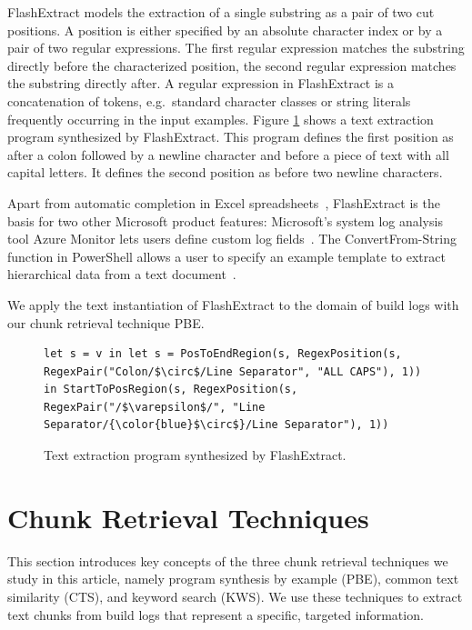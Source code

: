 FlashExtract models the extraction of a single substring as a pair of
two cut positions. A position is either specified by an absolute
character index or by a pair of two regular expressions. The first
regular expression matches the substring directly before the
characterized position, the second regular expression matches the
substring directly after. A regular expression in FlashExtract is a
concatenation of tokens, e.g.\ standard character classes or string
literals frequently occurring in the input examples. Figure
\ref{lst:prose-program} shows a text extraction program synthesized by
FlashExtract. This program defines the first position as after a colon
followed by a newline character and before a piece of text with all
capital letters. It defines the second position as before two newline
characters.

Apart from automatic completion in Excel
spreadsheets~\cite{excel2019flashfill}, FlashExtract is the basis for
two other Microsoft product features: Microsoft's system log analysis
tool Azure Monitor lets users define custom log
fields~\cite{azure2019custom}. The ConvertFrom-String function in
PowerShell allows a user to specify an example template to extract
hierarchical data from a text document~\cite{powershell2019convert}.

We apply the text instantiation of FlashExtract to the domain of build
logs with our chunk retrieval technique PBE\@.

\begin{figure}[!t]
  \centering
  \begin{lstlisting}[breaklines=true]
let s = v in let s = PosToEndRegion(s, RegexPosition(s, RegexPair("Colon/$\circ$/Line Separator", "ALL CAPS"), 1)) in StartToPosRegion(s, RegexPosition(s, RegexPair("/$\varepsilon$/", "Line Separator/{\color{blue}$\circ$}/Line Separator"), 1))
  \end{lstlisting}  
  \caption{Text extraction program synthesized by FlashExtract.}
  \label{lst:prose-program}
\end{figure}

\section{Chunk Retrieval Techniques}
\label{sec:techniques}
This section introduces key concepts of the three chunk retrieval
techniques we study in this article, namely program synthesis by
example (PBE), common text similarity (CTS), and keyword search (KWS).
We use these techniques to extract text chunks from build logs that
represent a specific, targeted information.


